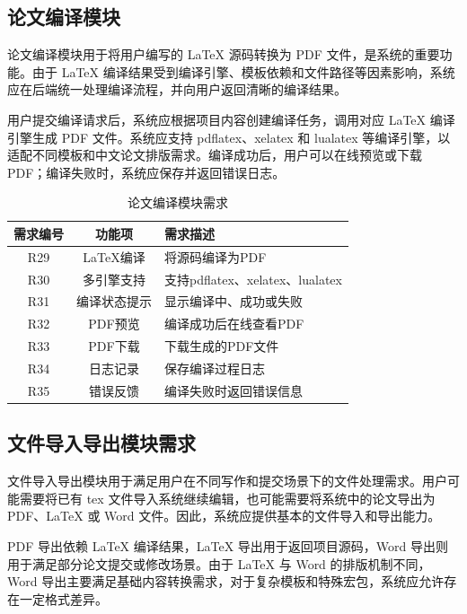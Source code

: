 \documentclass{xduugthesis}
\begin{document}
\subsection{论文编译模块}
论文编译模块用于将用户编写的 LaTeX 源码转换为 PDF 文件，是系统的重要功能。由于 LaTeX 编译结果受到编译引擎、模板依赖和文件路径等因素影响，系统应在后端统一处理编译流程，并向用户返回清晰的编译结果。

用户提交编译请求后，系统应根据项目内容创建编译任务，调用对应 LaTeX 编译引擎生成 PDF 文件。系统应支持 pdflatex、xelatex 和 lualatex 等编译引擎，以适配不同模板和中文论文排版需求。编译成功后，用户可以在线预览或下载 PDF；编译失败时，系统应保存并返回错误日志。

\begin{table}[!ht]
    \centering
    \caption{论文编译模块需求}
    \label{tab:compile-requirement}
    \begin{tabular}{|c|c|p{7cm}|}
        \hline
        需求编号 & 功能项 & 需求描述 \\
        \hline
        R29 & LaTeX编译 & 将源码编译为PDF \\
        \hline
        R30 & 多引擎支持 & 支持pdflatex、xelatex、lualatex \\
        \hline
        R31 & 编译状态提示 & 显示编译中、成功或失败 \\
        \hline
        R32 & PDF预览 & 编译成功后在线查看PDF \\
        \hline
        R33 & PDF下载 & 下载生成的PDF文件 \\
        \hline
        R34 & 日志记录 & 保存编译过程日志 \\
        \hline
        R35 & 错误反馈 & 编译失败时返回错误信息 \\
        \hline
    \end{tabular}
\end{table}

\subsection{文件导入导出模块需求}
文件导入导出模块用于满足用户在不同写作和提交场景下的文件处理需求。用户可能需要将已有 tex 文件导入系统继续编辑，也可能需要将系统中的论文导出为 PDF、LaTeX 或 Word 文件。因此，系统应提供基本的文件导入和导出能力。

PDF 导出依赖 LaTeX 编译结果，LaTeX 导出用于返回项目源码，Word 导出则用于满足部分论文提交或修改场景。由于 LaTeX 与 Word 的排版机制不同，Word 导出主要满足基础内容转换需求，对于复杂模板和特殊宏包，系统应允许存在一定格式差异。
\end{document}
